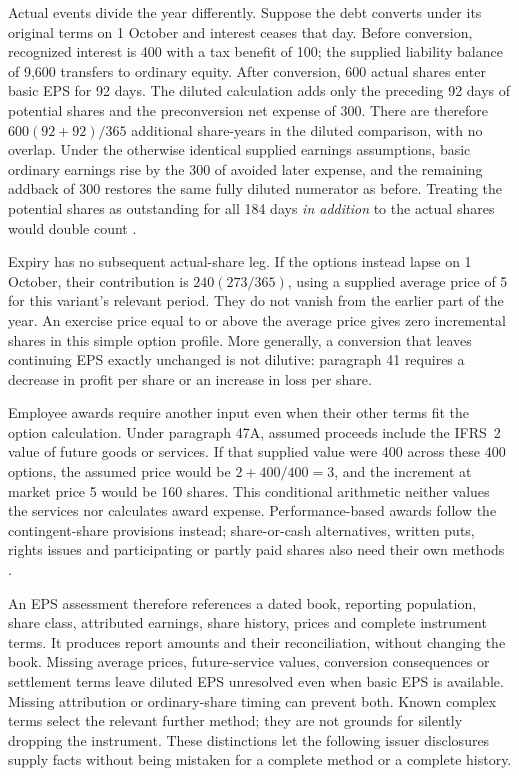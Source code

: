 Actual events divide the year differently. Suppose the debt converts
under its original terms on 1 October and interest ceases that day.
Before conversion, recognized interest is 400 with a tax benefit of 100;
the supplied liability balance of 9,600 transfers to ordinary equity.
After conversion, 600 actual shares enter basic EPS for 92 days.
The diluted calculation adds only the preceding 92 days of potential
shares and the preconversion net expense of 300. There are therefore
$600(92+92)/365$ additional share-years in the diluted comparison, with
no overlap. Under the otherwise identical supplied earnings assumptions,
basic ordinary earnings rise by the 300 of avoided later expense, and
the remaining addback of 300 restores the same fully diluted numerator
as before. Treating the potential shares as outstanding for all 184 days
\emph{in addition} to the actual shares would double count
\citep[IAS~33, paragraphs 21(c), 36--38]{eu20231803}.

Expiry has no subsequent actual-share leg. If the options instead lapse
on 1 October, their contribution is $240(273/365)$, using a supplied
average price of 5 for this variant's relevant period. They do not vanish
from the earlier part of the year. An exercise price equal to or above
the average price gives zero incremental shares in this simple option
profile. More generally, a conversion that leaves continuing EPS exactly
unchanged is not dilutive: paragraph 41 requires a decrease in profit
per share or an increase in loss per share.

Employee awards require another input even when their other terms fit
the option calculation. Under paragraph 47A, assumed proceeds include
the IFRS~2 value of future goods or services. If that supplied value were
400 across these 400 options, the assumed price would be
$2+400/400=3$, and the increment at market price 5 would be 160 shares.
This conditional arithmetic neither values the services nor calculates
award expense. Performance-based awards follow the contingent-share
provisions instead; share-or-cash alternatives, written puts, rights
issues and participating or partly paid shares also need their own
methods \citep[IAS~33, paragraphs 47A--63, A2 and A13--A16]{eu20231803}.

An EPS assessment therefore references a dated book, reporting population,
share class, attributed earnings, share history, prices and complete
instrument terms. It produces report amounts and their reconciliation,
without changing the book. Missing average prices, future-service values,
conversion consequences or settlement terms leave diluted EPS unresolved
even when basic EPS is available. Missing attribution or ordinary-share
timing can prevent both. Known complex terms select the relevant further
method; they are not grounds for silently dropping the instrument.
These distinctions let the following issuer disclosures supply facts
without being mistaken for a complete method or a complete history.
